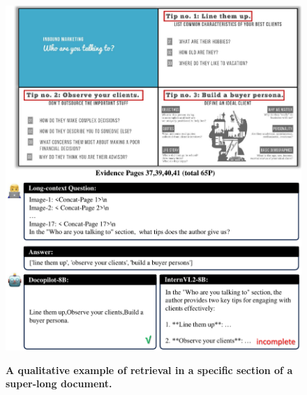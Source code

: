 \begin{figure}[t]
    \centering
    {\includegraphics[width=0.6\linewidth]{figure/sample5.pdf}}
    \caption{\textbf{A qualitative example of retrieval in a specific section of a super-long document.}}
    \label{fig:good_sample5}
\end{figure}
